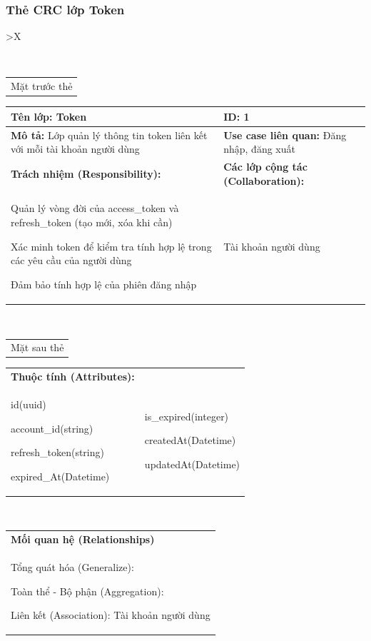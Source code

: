 \subsubsection{Thẻ CRC lớp Token}

\begin{xltabular}{\textwidth}{
		>{\centering\arraybackslash}X
	}
	\caption{\bfseries \fontsize{12pt}{0pt}\selectfont Thẻ CRC lớp Token}
	\\
	\begin{tabularx}{0.9\textwidth}{X}
		Mặt trước thẻ
	\end{tabularx}
	\begin{tabularx}{0.9\textwidth}{|X|X|}
		\hline
		\textbf{Tên lớp:} Token                                                           & \textbf{ID:} 1                                     \\
		\hline
		\textbf{Mô tả:} Lớp quản lý thông tin token liên kết với mỗi tài khoản người dùng & \textbf{Use case liên quan:}  Đăng nhập, đăng xuất \\
		\hline
		\textbf{Trách nhiệm (Responsibility):}                                            & \textbf{Các lớp cộng tác (Collaboration):}         \\
		Quản lý vòng đời của access\_token và refresh\_token (tạo mới, xóa khi cần)

		Xác minh token để kiểm tra tính hợp lệ trong các yêu cầu của người dùng

		Đảm bảo tính hợp lệ của phiên đăng nhập
		                                                                                  &
		Tài khoản người dùng
		\\
		\hline
	\end{tabularx}
	\\
	\begin{tabularx}{0.9\textwidth}{X}
		Mặt sau thẻ
	\end{tabularx}
	\begin{tabularx}{0.9\textwidth}{|X|X|}
		\hline
		\textbf{Thuộc tính (Attributes):} & \\
		id(uuid)

		account\_id(string)

		refresh\_token(string)

		expired\_At(Datetime)
		                                  &
		is\_expired(integer)

		createdAt(Datetime)

		updatedAt(Datetime)
		\\ \hline
	\end{tabularx}
	\\
	\begin{tabularx}{0.9\textwidth}{|X|}
		\hline
		\textbf{Mối quan hệ (Relationships)} \\
		Tổng quát hóa (Generalize):

		Toàn thể - Bộ phận (Aggregation):

		Liên kết (Association): Tài khoản người dùng
		\\
		\hline
	\end{tabularx}
\end{xltabular}


